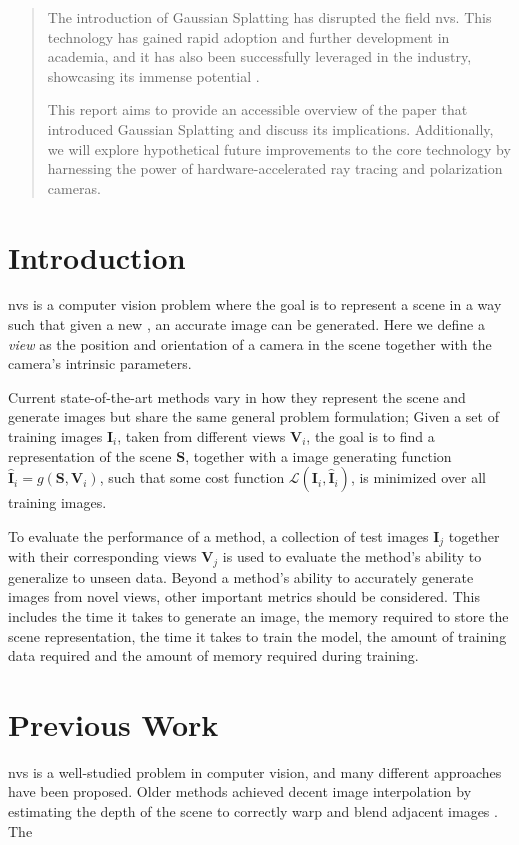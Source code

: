 \begin{abstract}
    The introduction of Gaussian Splatting has disrupted the field \gls{nvs}. This technology has gained rapid adoption and further development in academia, and it has also been successfully leveraged in the industry, showcasing its immense potential \cite{LumaAIVideo}.

    This report aims to provide an accessible overview of the paper that introduced Gaussian Splatting and discuss its implications.
    Additionally, we will explore hypothetical future improvements to the core technology by harnessing the power of hardware-accelerated ray tracing and polarization cameras.


\end{abstract}

\section{Introduction}
\gls{nvs} is a computer vision problem where the goal is to represent a scene in a way such that given a new , an accurate image can be generated.
Here we define a \textit{view} as the position and orientation of a camera in the scene together with the camera's intrinsic parameters.

Current state-of-the-art methods vary in how they represent the scene and generate images
but share the same general problem formulation;
Given a set of training images $\bm{I}_i$,
taken from different views $\bm{V}_i$,
the goal is to find a representation of the scene $\bm{S}$,
together with a image generating function $\bm{\hat{I}}_i = g(\bm{S}, \bm{V}_i)$,
such that some cost function $\mathcal{L}(\bm{I}_i, \bm{\hat{I}}_i)$,
is minimized over all training images.

To evaluate the performance of a method, a collection of test images $\bm{I}_j$ together with their corresponding views $\bm{V}_j$ is used to evaluate the method's ability to generalize to unseen data.
Beyond a method's ability to accurately generate images from novel views, other important metrics should be considered.
This includes the time it takes to generate an image, the memory required to store the scene representation, the time it takes to train the model, the amount of training data required and the amount of memory required during training.



\section{Previous Work}
\gls{nvs} is a well-studied problem in computer vision, and many different approaches have been proposed.
Older methods achieved decent image interpolation by estimating the depth of the scene to correctly warp and blend adjacent images \cite{zitnickHighqualityVideoView2004}.
The

